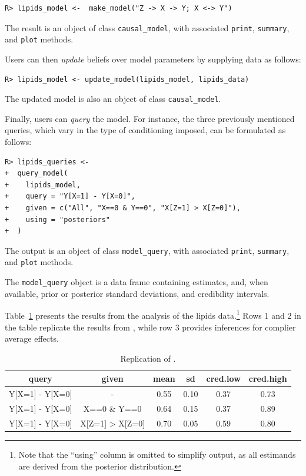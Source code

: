 \documentclass[
  11pt,
  article]{jss}
\begin{document}
\begin{verbatim}
R> lipids_model <-  make_model("Z -> X -> Y; X <-> Y") 
\end{verbatim}

The result is an object of class \texttt{causal\_model}, with associated
\texttt{print}, \texttt{summary}, and \texttt{plot} methods.

Users can then \emph{update} beliefs over model parameters by supplying
data as follows:

\begin{verbatim}
R> lipids_model <- update_model(lipids_model, lipids_data)
\end{verbatim}

The updated model is also an object of class \texttt{causal\_model}.

Finally, users can \emph{query} the model. For instance, the three
previously mentioned queries, which vary in the type of conditioning
imposed, can be formulated as follows:

\begin{verbatim}
R> lipids_queries <-
+  query_model(
+    lipids_model,
+    query = "Y[X=1] - Y[X=0]",
+    given = c("All", "X==0 & Y==0", "X[Z=1] > X[Z=0]"),
+    using = "posteriors"
+  )
\end{verbatim}

The output is an object of class \texttt{model\_query}, with associated
\texttt{print}, \texttt{summary}, and \texttt{plot} methods.

The \texttt{model\_query} object is a data frame containing estimates,
and, when available, prior or posterior standard deviations, and
credibility intervals.

Table~\ref{tbl-lipids} presents the results from the analysis of the
lipids data.\footnote{Note that the ``using'' column is omitted to
  simplify output, as all estimands are derived from the posterior
  distribution.} Rows 1 and 2 in the table replicate the results from
\citet{chickering_clinicians_1996}, while row 3 provides inferences for
complier average effects.

\begin{longtable}[t]{cccccc}

\caption{\label{tbl-lipids}Replication of
\citet{chickering_clinicians_1996}.}

\tabularnewline

\toprule
query & given & mean & sd & cred.low & cred.high\\
\midrule
Y[X=1] - Y[X=0] & - & 0.55 & 0.10 & 0.37 & 0.73\\
Y[X=1] - Y[X=0] & X==0 \& Y==0 & 0.64 & 0.15 & 0.37 & 0.89\\
Y[X=1] - Y[X=0] & X[Z=1] > X[Z=0] & 0.70 & 0.05 & 0.59 & 0.80\\
\bottomrule

\end{longtable}
\end{document}
